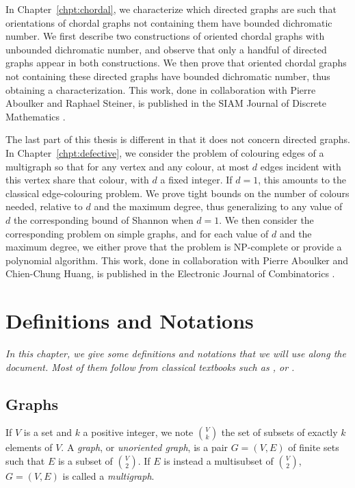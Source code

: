 \medskip
In Chapter~\ref{chpt:chordal}, we characterize which directed graphs are such that orientations of chordal graphs not containing them have bounded dichromatic number. We first describe two constructions of oriented chordal graphs with unbounded dichromatic number, and observe that only a handful of directed graphs appear in both constructions. We then prove that oriented chordal graphs not containing these directed graphs have bounded dichromatic number, thus obtaining a characterization. This work, done in collaboration with Pierre Aboulker and Raphael Steiner, is published in the SIAM Journal of Discrete Mathematics \cite{AAS22}.


\bigskip
The last part of this thesis is different in that it does not concern directed graphs. In Chapter~\ref{chpt:defective}, we consider the problem of colouring edges of a multigraph so that for any vertex and any colour, at most $d$ edges incident with this vertex share that colour, with $d$ a fixed integer. If $d = 1$, this amounts to the classical edge-colouring problem. We prove tight bounds on the number of colours needed, relative to $d$ and the maximum degree, thus generalizing to any value of $d$ the corresponding bound of Shannon \cite{S49} when $d=1$. We then consider the corresponding problem on simple graphs, and for each value of $d$ and the maximum degree, we either prove that the problem is NP-complete or provide a polynomial algorithm. This work, done in collaboration with Pierre Aboulker and Chien-Chung Huang, is published in the Electronic Journal of Combinatorics \cite{AAH22}. 
\chapter{Definitions and Notations}

\emph{In this chapter, we give some definitions and notations that we will use along the document. Most of them follow from classical textbooks such as \cite{BG18}, \cite{BM08} or \cite{D05}.}

\section{Graphs}

If $V$ is a set and $k$ a positive integer, we note $V \choose k$ the set of subsets of exactly $k$ elements of $V$.
A \emph{graph}, or \emph{unoriented graph}, is a pair $G=(V,E)$ of finite sets such that $E$ is a subset of  $V \choose 2$. If $E$ is instead a multisubset of $V \choose 2$, $G = (V,E)$ is called a \emph{multigraph}.

